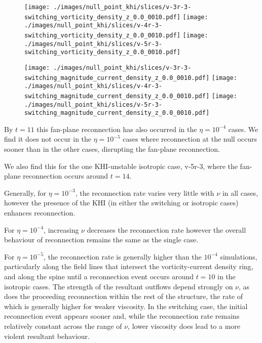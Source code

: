 \begin{figure}[H]
  \centering
  \texttt{[image: ./images/null\_point\_khi/slices/v-3r-3-switching\_vorticity\_density\_z\_0.0\_0010.pdf]}
  \texttt{[image: ./images/null\_point\_khi/slices/v-4r-3-switching\_vorticity\_density\_z\_0.0\_0010.pdf]}
  \texttt{[image: ./images/null\_point\_khi/slices/v-5r-3-switching\_vorticity\_density\_z\_0.0\_0010.pdf]}
\end{figure}

\begin{figure}[H]
  \centering
  \texttt{[image: ./images/null\_point\_khi/slices/v-3r-3-switching\_magnitude\_current\_density\_z\_0.0\_0010.pdf]}
  \texttt{[image: ./images/null\_point\_khi/slices/v-4r-3-switching\_magnitude\_current\_density\_z\_0.0\_0010.pdf]}
  \texttt{[image: ./images/null\_point\_khi/slices/v-5r-3-switching\_magnitude\_current\_density\_z\_0.0\_0010.pdf]}
\end{figure}

By $t=11$ this fan-plane reconnection has also occurred in the $\eta=10^{-4}$ cases. We find it does not occur in the $\eta=10^{-5}$ cases where reconnection at the null occurs sooner than in the other cases, disrupting the fan-plane reconnection.

We also find this for the one KHI-unstable isotropic case, v-5r-3, where the fan-plane reconnection occurs around $t=14$.

Generally, for $\eta=10^{-3}$, the reconnection rate varies very little with $\nu$ in all cases, however the presence of the KHI (in either the switching or isotropic cases) enhances reconnection.

For $\eta=10^{-4}$, increasing $\nu$ decreases the reconnection rate however the overall behaviour of reconnection remains the same as the single case.

For $\eta=10^{-5}$, the reconnection rate is generally higher than the $10^{-4}$ simulations, particularly along the field lines that intersect the vorticity-current density ring, and along the spine until a reconnection event occurs around $t=10$ in the isotropic cases. The strength of the resultant outflows depend strongly on $\nu$, as does the proceeding reconnection within the rest of the structure, the rate of which is generally higher for weaker viscosity. In the switching case, the initial reconnection event appears sooner and, while the reconnection rate remains relatively constant across the range of $\nu$, lower viscosity does lead to a more violent resultant behaviour.

